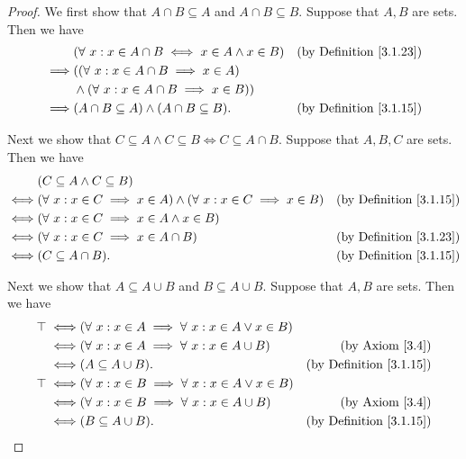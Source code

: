 \begin{proof}
We first show that \(A \cap B \subseteq A\) and \(A \cap B \subseteq B\).
Suppose that \(A, B\) are sets.
Then we have
\begin{align*}
& (\forall\ x : x \in A \cap B \iff x \in A \land x \in B) & \text{(by Definition \ref{3.1.23})} \\
\implies & ((\forall\ x : x \in A \cap B \implies x \in A) \\
& \land (\forall\ x : x \in A \cap B \implies x \in B)) \\
\implies & (A \cap B \subseteq A) \land (A \cap B \subseteq B). & \text{(by Definition \ref{3.1.15})}
\end{align*}

Next we show that \(C \subseteq A \land C \subseteq B \iff C \subseteq A \cap B\).
Suppose that \(A, B, C\) are sets.
Then we have
\begin{align*}
& (C \subseteq A \land C \subseteq B) \\
\iff & (\forall\ x : x \in C \implies x \in A) \land (\forall\ x : x \in C \implies x \in B) & \text{(by Definition \ref{3.1.15})} \\
\iff & (\forall\ x : x \in C \implies x \in A \land x \in B) \\
\iff & (\forall\ x : x \in C \implies x \in A \cap B) & \text{(by Definition \ref{3.1.23})} \\
\iff & (C \subseteq A \cap B). & \text{(by Definition \ref{3.1.15})}
\end{align*}

Next we show that \(A \subseteq A \cup B\) and \(B \subseteq A \cup B\).
Suppose that \(A, B\) are sets.
Then we have
\begin{align*}
\top \iff & (\forall\ x : x \in A \implies \forall\ x : x \in A \lor x \in B) \\
\iff & (\forall\ x : x \in A \implies \forall\ x : x \in A \cup B) & \text{(by Axiom \ref{3.4})} \\
\iff & (A \subseteq A \cup B). & \text{(by Definition \ref{3.1.15})} \\
\top \iff & (\forall\ x : x \in B \implies \forall\ x : x \in A \lor x \in B) \\
\iff & (\forall\ x : x \in B \implies \forall\ x : x \in A \cup B) & \text{(by Axiom \ref{3.4})} \\
\iff & (B \subseteq A \cup B). & \text{(by Definition \ref{3.1.15})}
\end{align*}


\end{proof}

